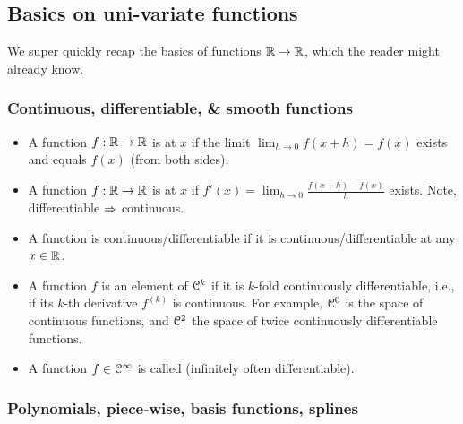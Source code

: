 \subsection{Basics on uni-variate functions}

We super quickly recap the basics of functions ${\mathbb{R}} \to {\mathbb{R}}$, which the reader might already know.

\subsubsection{Continuous, differentiable, \& smooth functions}

\begin{itemize}
\item A function $f:{\mathbb{R}}\to{\mathbb{R}}$ is  at $x$ if the limit $\lim_{h\to 0} f(x+h) = f(x)$ exists and equals $f(x)$ (from both sides).
\item A function $f:{\mathbb{R}}\to{\mathbb{R}}$ is  at $x$ if $f'(x) = \lim_{h\to 0} \frac{f(x+h) - f(x)}{h}$ exists. Note, differentiable $\Rightarrow$ continuous.
\item A function is continuous/differentiable if it is continuous/differentiable at any $x\in{\mathbb{R}}$.
\item A function $f$ is an element of ${\cal C}^k$ if it is $k$-fold continuously differentiable, i.e., if its $k$-th derivative $f^{(k)}$ is continuous. For example, ${\cal C}^0$ is the space of continuous functions, and ${\cal C}^2$ the space of twice continuously differentiable functions.
\item A function $f\in{\cal C}^\infty$ is called  (infinitely often differentiable).
\end{itemize}

\subsubsection{Polynomials, piece-wise, basis functions, splines}

